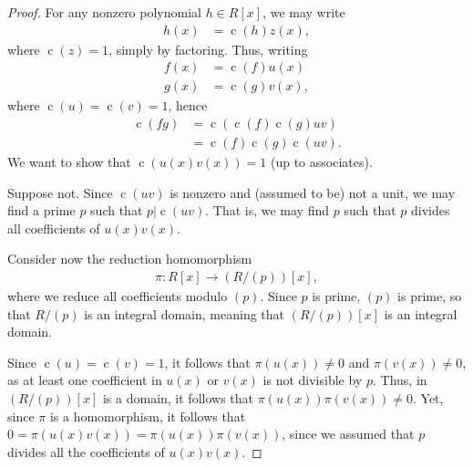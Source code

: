\documentclass[10pt]{mypackage}
\begin{document}
\begin{proof}
  For any nonzero polynomial $h\in R[x]$, we may write
  \begin{align*}
    h(x) &= \operatorname{c}\left( h \right) z(x),
  \end{align*}
  where $\operatorname{c}\left( z \right) = 1$, simply by factoring. Thus, writing
  \begin{align*}
    f(x) &= \operatorname{c}\left( f \right) u(x)\\
    g(x) &= \operatorname{c}\left( g \right) v(x),
  \end{align*}
  where $\operatorname{c}\left( u \right) = \operatorname{c}\left( v \right) = 1$, hence
  \begin{align*}
    \operatorname{c}\left( fg \right) &= \operatorname{c}\left( \operatorname{c}\left( f \right)\operatorname{c}\left( g \right)u v \right)\\
                                      &= \operatorname{c}\left( f \right)\operatorname{c}\left( g \right)\operatorname{c}\left( uv \right).
  \end{align*}
  We want to show that $\operatorname{c}\left( u(x)v(x) \right) = 1$ (up to associates).\newline

  Suppose not. Since $ \operatorname{c}\left( uv \right) $ is nonzero and (assumed to be) not a unit, we may find a prime $p$ such that $ p | \operatorname{c}\left( u v \right) $. That is, we may find $p$ such that $p$ divides all coefficients of $u(x)v(x)$.\newline

  Consider now the reduction homomorphism
  \begin{align*}
    \pi\colon R[x]\rightarrow \left( R/\left( p \right) \right)[x],
  \end{align*}
  where we reduce all coefficients modulo $\left( p \right)$. Since $p$ is prime, $ \left( p \right) $ is prime, so that $R/\left( p \right)$ is an integral domain, meaning that $\left( R/\left( p \right) \right)[x]$ is an integral domain.\newline

  Since $ \operatorname{c}\left( u \right) = \operatorname{c}\left( v \right) = 1 $, it follows that $\pi\left( u(x) \right) \neq 0$ and $\pi\left( v(x) \right) \neq 0$, as at least one coefficient in $u(x)$ or $v(x)$ is not divisible by $p$. Thus, in $\left( R/\left( p \right) \right)[x]$ is a domain, it follows that $\pi\left( u(x) \right)\pi\left( v(x) \right)\neq 0$. Yet, since $\pi$ is a homomorphism, it follows that $0 = \pi\left( u(x)v(x) \right) = \pi\left( u(x) \right)\pi\left( v(x) \right)$, since we assumed that $p$ divides all the coefficients of $u(x)v(x)$.
\end{proof}
\end{document}
